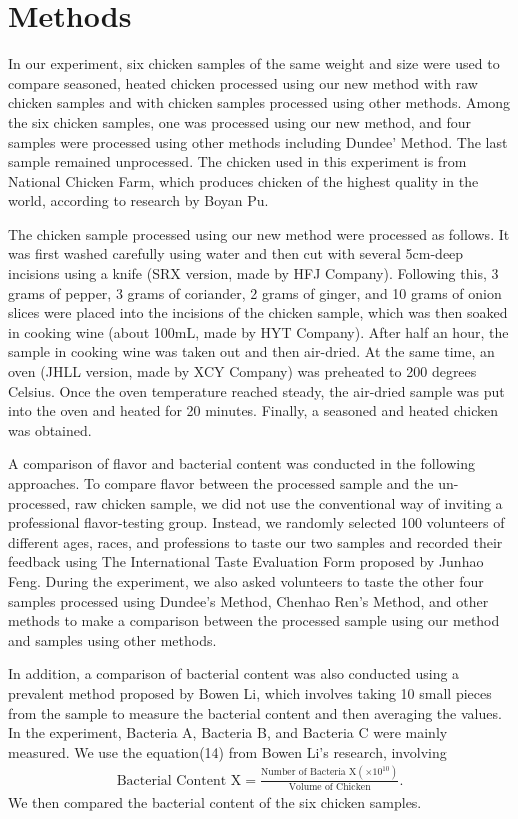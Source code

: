 \documentclass[a4paper,12pt]{article}
\begin{document}
	\section{Methods}
	In our experiment, six chicken samples of the same weight and size were used to compare seasoned, heated chicken processed using our new method with raw chicken samples and with chicken samples processed using other methods. Among the six chicken samples, one was processed using our new method, and four samples were processed using other methods including Dundee' Method\cite{dundee}. The last sample remained unprocessed. The chicken used in this experiment is from National Chicken Farm, which produces chicken of the highest quality in the world, according to research by Boyan Pu\cite{pby}. 
	
	The chicken sample processed using our new method were processed as follows. It was first washed carefully using water and then cut with several 5cm-deep incisions using a knife (SRX version, made by HFJ Company). Following this, 3 grams of pepper, 3 grams of coriander, 2 grams of ginger, and 10 grams of onion slices were placed into the incisions of the chicken sample, which was then soaked in cooking wine (about 100mL, made by HYT Company). After half an hour, the sample in cooking wine was taken out and then air-dried. At the same time, an oven (JHLL version, made by XCY Company) was preheated to 200 degrees Celsius. Once the oven temperature reached steady, the air-dried sample was put into the oven and heated for 20 minutes. Finally, a seasoned and heated chicken was obtained.
	
	A comparison of flavor and bacterial content was conducted in the following approaches. To compare flavor between the processed sample and the un-processed, raw chicken sample, we did not use the conventional way of inviting a professional flavor-testing group\cite{zxh}. Instead, we randomly selected 100 volunteers of different ages, races, and professions to taste our two samples and recorded their feedback using The International Taste Evaluation Form proposed by Junhao Feng\cite{fjh}. During the experiment, we also asked volunteers to taste the other four samples processed using Dundee's Method\cite{dundee}, Chenhao Ren's Method\cite{rch}, and other methods to make a comparison between the processed sample using our method and samples using other methods. 
 
    In addition, a comparison of bacterial content was also conducted using a prevalent method proposed by Bowen Li\cite{lbw}, which involves taking 10 small pieces from the sample to measure the bacterial content and then averaging the values. In the experiment, Bacteria A, Bacteria B, and Bacteria C were mainly measured. We use the equation(14) from Bowen Li's research\cite{lbw}, involving
	\begin{align}
		\text{Bacterial Content X}=\frac{\text{Number of Bacteria X}(\times 10^{10})}{\text{Volume of Chicken}}.
	\end{align}
    We then compared the bacterial content of the six chicken samples.
\end{document}
